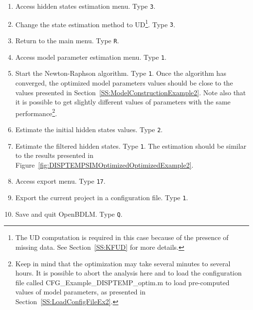 \begin{enumerate}
\item Access hidden states estimation menu. Type \colorbox{light-gray}{\lstinline[basicstyle = \mlttfamily \small, backgroundcolor = \color{light-gray}]!3!}. 
\item Change the state estimation method to UD\footnote{The UD computation is required in this case because of the presence of missing data. See Section~\ref{SS:KFUD} for more details.}. Type \colorbox{light-gray}{\lstinline[basicstyle = \mlttfamily \small, backgroundcolor = \color{light-gray}]!3!}. 
\item Return to the main menu. Type \colorbox{light-gray}{\lstinline[basicstyle = \mlttfamily \small, backgroundcolor = \color{light-gray}]!R!}.
\item Access model parameter estimation menu. Type \colorbox{light-gray}{\lstinline[basicstyle = \mlttfamily \small, backgroundcolor = \color{light-gray}]!1!}. 
\item Start the Newton-Raphson algorithm. Type \colorbox{light-gray}{\lstinline[basicstyle = \mlttfamily \small, backgroundcolor = \color{light-gray}]!1!}. Once the algorithm has converged, the optimized model parameters values should be close to the values presented in Section~\ref{SS:ModelConstructionExample2}. Note also that it is possible to get slightly different values of parameters with the same performance\footnote{Keep in mind that the optimization may take several minutes to several hours. It is possible to abort the analysis here and to load the configuration file called CFG\_Example\_DISPTEMP\_optim.m to load pre-computed values of model parameters, as presented in Section~\ref{SS:LoadConfigFileEx2}.}.
\item Estimate the initial hidden states values. Type \colorbox{light-gray}{\lstinline[basicstyle = \mlttfamily \small, backgroundcolor = \color{light-gray}]!2!}.
\item Estimate the filtered hidden states. Type \colorbox{light-gray}{\lstinline[basicstyle = \mlttfamily \small, backgroundcolor = \color{light-gray}]!1!}. The estimation should be similar to the results presented in Figure~\ref{fig:DISPTEMPSIMOptimizedOptimizedExample2}.
\item Access export menu. Type \colorbox{light-gray}{\lstinline[basicstyle = \mlttfamily \small, backgroundcolor = \color{light-gray}]!17!}. 
\item Export the current project in a configuration file. Type \colorbox{light-gray}{\lstinline[basicstyle = \mlttfamily \small, backgroundcolor = \color{light-gray}]!1!}.
\item Save and quit OpenBDLM. Type \colorbox{light-gray}{\lstinline[basicstyle = \mlttfamily \small, backgroundcolor = \color{light-gray}]!Q!}.
\end{enumerate}





